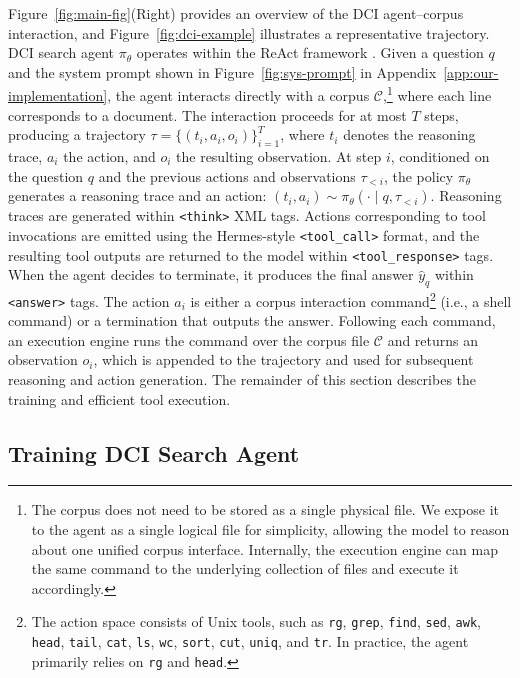 \documentclass{llmxive}
\begin{document}
Figure~\ref{fig:main-fig}(Right) provides an overview of the DCI agent--corpus interaction, and Figure~\ref{fig:dci-example} illustrates a representative trajectory. DCI search agent $\pi_{\theta}$ operates within the ReAct framework \citep{yao2023react}. Given a question $q$ and the system prompt shown in Figure~\ref{fig:sys-prompt} in Appendix~\ref{app:our-implementation}, the agent interacts directly with a corpus $\mathcal{C}$,\footnote{The corpus does not need to be stored as a single physical file. We expose it to the agent as a single logical file for simplicity, allowing the model to reason about one unified corpus interface. Internally, the execution engine can map the same command to the underlying collection of files and execute it accordingly.} where each line corresponds to a document. The interaction proceeds for at most $T$ steps, producing a trajectory $\tau = \{(t_i, a_i, o_i)\}_{i=1}^{T}$, where $t_i$ denotes the reasoning trace, $a_i$ the action, and $o_i$ the resulting observation. At step $i$, conditioned on the question $q$ and the previous actions and observations $\tau_{<i}$, the policy $\pi_{\theta}$ generates a reasoning trace and an action: $(t_i, a_i) \sim \pi_{\theta}(\cdot \mid q, \tau_{<i})$. Reasoning traces are generated within \texttt{<think>} XML tags. Actions corresponding to tool invocations are emitted using the Hermes-style \texttt{<tool\_call>} format, and the resulting tool outputs are returned to the model within \texttt{<tool\_response>} tags. When the agent decides to terminate, it produces the final answer $\hat{y}_q$ within \texttt{<answer>} tags. The action $a_i$ is either a corpus interaction command\footnote{The action space consists of Unix tools, such as \texttt{rg}, \texttt{grep}, \texttt{find}, \texttt{sed}, \texttt{awk}, \texttt{head}, \texttt{tail}, \texttt{cat}, \texttt{ls}, \texttt{wc}, \texttt{sort}, \texttt{cut}, \texttt{uniq}, and \texttt{tr}. In practice, the agent primarily relies on \texttt{rg} and \texttt{head}.} (i.e., a shell command) or a termination that outputs the answer. Following each command, an execution engine runs the command over the corpus file $\mathcal{C}$ and returns an observation $o_i$, which is appended to the trajectory and used for subsequent reasoning and action generation. The remainder of this section describes the training and efficient tool execution.

\subsection{Training DCI Search Agent}
\end{document}
